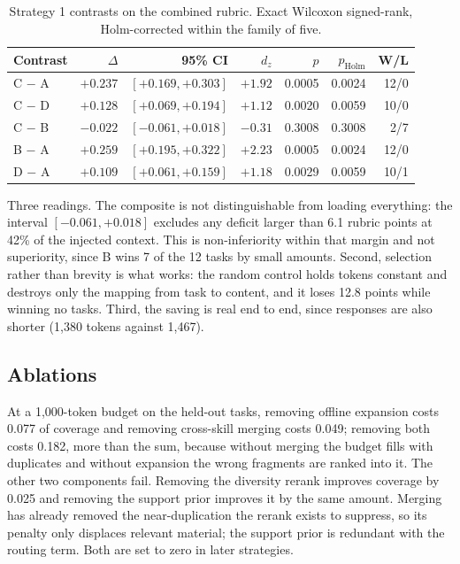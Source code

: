 \documentclass[11pt]{article}
\begin{document}
\begin{table}[t]\centering\small
\begin{tabular}{lrrrrrr}
\toprule
Contrast & $\Delta$ & 95\% CI & $d_z$ & $p$ & $p_{\text{Holm}}$ & W/L \\
\midrule
C $-$ A & $+0.237$ & $[+0.169, +0.303]$ & $+1.92$ & 0.0005 & 0.0024 & 12/0 \\
C $-$ D & $+0.128$ & $[+0.069, +0.194]$ & $+1.12$ & 0.0020 & 0.0059 & 10/0 \\
C $-$ B & $-0.022$ & $[-0.061, +0.018]$ & $-0.31$ & 0.3008 & 0.3008 & 2/7 \\
B $-$ A & $+0.259$ & $[+0.195, +0.322]$ & $+2.23$ & 0.0005 & 0.0024 & 12/0 \\
D $-$ A & $+0.109$ & $[+0.061, +0.159]$ & $+1.18$ & 0.0029 & 0.0059 & 10/1 \\
\bottomrule
\end{tabular}
\caption{Strategy 1 contrasts on the combined rubric. Exact Wilcoxon signed-rank, Holm-corrected
within the family of five.}
\label{tab:s1contrasts}
\end{table}

Three readings. The composite is not distinguishable from loading everything: the interval
$[-0.061, +0.018]$ excludes any deficit larger than 6.1 rubric points at 42\% of the injected
context. This is non-inferiority within that margin and not superiority, since B wins 7 of the 12
tasks by small amounts. Second, selection rather than brevity is what works: the random control
holds tokens constant and destroys only the mapping from task to content, and it loses 12.8 points
while winning no tasks. Third, the saving is real end to end, since responses are also shorter
(1,380 tokens against 1,467).

\subsection{Ablations}
\label{sec:s1abl}

At a 1,000-token budget on the held-out tasks, removing offline expansion costs 0.077 of coverage
and removing cross-skill merging costs 0.049; removing both costs 0.182, more than the sum, because
without merging the budget fills with duplicates and without expansion the wrong fragments are
ranked into it. The other two components fail. Removing the diversity rerank improves coverage by
0.025 and removing the support prior improves it by the same amount. Merging has already removed
the near-duplication the rerank exists to suppress, so its penalty only displaces relevant material;
the support prior is redundant with the routing term. Both are set to zero in later strategies.
\end{document}
